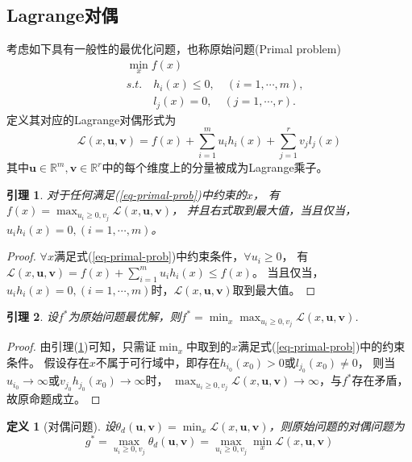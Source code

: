 \documentclass[12pt, a4paper, oneside]{ctexart}
\newtheorem{definition}{定义}
\newtheorem{lemma}{引理}
\numberwithin{equation}{section}  %
\newcounter{problem}  %
\let\geq=\geqslant %
\def\bd{\boldsymbol}        %
\def\R{\mathbb{R}}          %
\def\L{\mathcal{L}}         %
\begin{document}
\subsection{Lagrange对偶}
考虑如下具有一般性的最优化问题，也称原始问题(Primal problem)
\begin{equation}\label{eq-primal-prob}
    \begin{aligned}
        &\ \min_{x}f(x)\\
        &\ s.t.\quad h_i(x)\leqslant 0,\quad (i=1,\cdots,m),\\
        &\ \phantom{s.t.}\quad l_j(x)=0,\quad (j=1,\cdots,r).
    \end{aligned}
\end{equation}
定义其对应的Lagrange对偶形式为
\begin{equation}
    \L(x,\bd{u},\bd{v}) = f(x) + \sum_{i=1}^mu_ih_i(x)+\sum_{j=1}^rv_jl_j(x)
\end{equation}
其中$\bd{u}\in\R^m,\bd{v}\in\R^r$中的每个维度上的分量被成为Lagrange乘子。
\begin{lemma}\label{lemma1}
    对于任何满足(\ref{eq-primal-prob})中约束的$x$，
    有$f(x)=\max_{u_i\geqslant 0,v_j}\L(x,\bd{u},\bd{v})$，
    并且右式取到最大值，当且仅当，$u_ih_i(x)=0,(i=1,\cdots,m)$。
\end{lemma}
\begin{proof}
    $\forall x$满足式(\ref{eq-primal-prob})中约束条件，$\forall u_i\geqslant 0$，
    有$\L(x,\bd{u},\bd{v})=f(x)+\sum_{i=1}^mu_ih_i(x)\leqslant f(x)$。
    当且仅当，$u_ih_i(x)=0,(i=1,\cdots,m)$时，$\L(x,\bd{u},\bd{v})$取到最大值。
\end{proof}
\begin{lemma}
    设$f^*$为原始问题最优解，则$f^*=\min_x\max_{u_i\geqslant 0,v_j}\L(x,\bd{u},\bd{v})$.
\end{lemma}
\begin{proof}
    由引理(\ref{lemma1})可知，只需证$\min_x$中取到的$x$满足式(\ref{eq-primal-prob})中的约束条件。
    假设存在$x$不属于可行域中，即存在$h_{i_0}(x_0)>0$或$l_{j_0}(x_0)\neq 0$，
    则当$u_{i_0}\to\infty$或$v_{j_0}h_{j_0}(x_0)\to\infty$时，
    $\max_{u_i\geq0,v_j}\L(x,\bd{u},\bd{v})\to\infty$，与$f^*$存在矛盾，故原命题成立。
\end{proof}
\begin{definition}[对偶问题]
    设$\theta_d(\bd{u},\bd{v})=\min_x\L(x,\bd{u},\bd{v})$，则原始问题的对偶问题为
    \begin{equation}
        g^*=\max_{u_i\geqslant 0,v_j}\theta_d(\bd{u},\bd{v}) = \max_{u_i\geqslant0,v_j}\min_x\L(x,\bd{u},\bd{v})
    \end{equation}
\end{definition}
\end{document}
